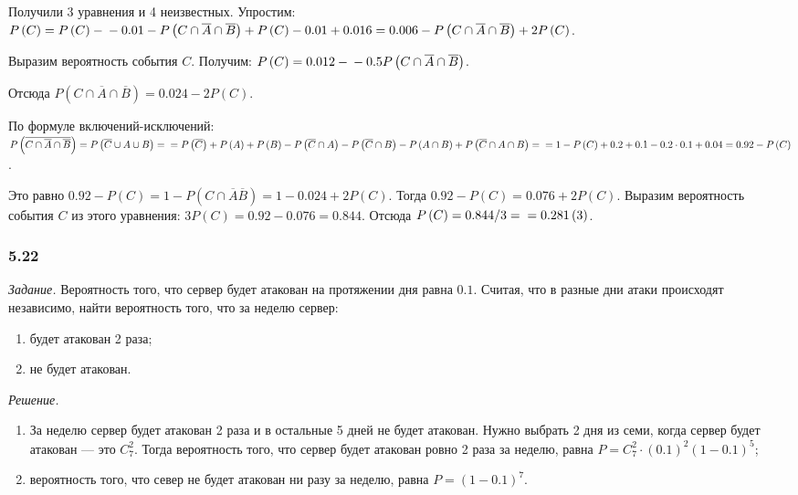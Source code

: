Получили 3 уравнения и 4 неизвестных.
Упростим:
$P \left( C \right) =
P \left( C \right) - \\
- 0.01 - P \left( C \cap \overline{A} \cap \overline{B} \right) + P \left( C \right) - 0.01 + 0.016 =
0.006 - P \left( C \cap \overline{A} \cap \overline{B} \right) + 2P \left( C \right) $.

Выразим вероятность события $C$.
Получим:
$P \left( C \right) = 0.012 - \\
- 0.5 P \left( C \cap \overline{A} \cap \overline{B} \right) $.

Отсюда $P \left( C \cap \overline{A} \cap \overline{B} \right) = 0.024 - 2 P \left( C \right) $.

По формуле включений-исключений:
$P \left( \overline{C \cap \overline{A} \cap \overline{B}} \right) =
P \left( \overline{C} \cup A \cup B \right) = \\
= P \left( \overline{C} \right) +
P \left( A \right) +
P \left( B \right) -
P \left( \overline{C} \cap A \right) -
P \left( \overline{C} \cap B \right) - P \left( A \cap B \right) + P \left( \overline{C} \cap A \cap B \right) = \\
= 1 - P \left( C \right) + 0.2 + 0.1 - 0.2 \cdot 0.1 + 0.04 =
0.92 - P \left( C \right) $.

Это равно $0.92 - P \left( C \right) = 1 - P \left( C \cap \overline{A} \overline{B} \right) = 1 - 0.024 + 2 P \left( C \right) $.
Тогда $0.92 - P \left( C \right) = 0.076 + 2 P \left( C \right) $.
Выразим вероятность события $C$ из этого уравнения: $3P \left( C \right) = 0.92 - 0.076 = 0.844$.
Отсюда $P \left( C \right) = 0.844/3 = \\ = 0.281 \left( 3 \right) $.

\subsubsection*{5.22}

\textit{Задание.} Вероятность того, что сервер будет атакован на протяжении дня равна $0.1$.
Считая, что в разные дни атаки происходят независимо, найти вероятность того, что за неделю сервер:
\begin{enumerate}[label=\alph*)]
\item будет атакован 2 раза;
\item не будет атакован.
\end{enumerate}

\textit{Решение.}
\begin{enumerate}[label=\alph*)]
\item За неделю сервер будет атакован 2 раза и в остальные 5 дней не будет атакован.
Нужно выбрать 2 дня из семи, когда сервер будет атакован --- это $C_7^2$.
Тогда вероятность того, что сервер будет атакован ровно 2 раза за неделю, равна
$P =
C_7^2 \cdot \left( 0.1 \right)^2 \left( 1 - 0.1 \right)^5$; 
\item вероятность того, что север не будет атакован ни разу за неделю, равна $P = \left( 1 - 0.1 \right)^7$.
\end{enumerate}

